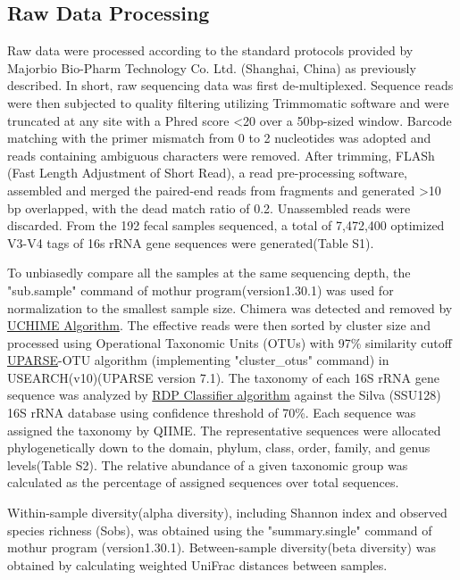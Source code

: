 \documentclass[fleqn,10pt, lineno]{wlpeerj} %
\begin{document}
  \subsection*{Raw Data Processing}
  Raw data were processed according to the standard protocols provided by Majorbio Bio-Pharm Technology Co. Ltd. (Shanghai, China) as previously described\citep{liu2018splenectomy, wang2018bacterial}. In short, raw sequencing data was first de-multiplexed. Sequence reads were then subjected to quality filtering utilizing Trimmomatic software\citep{bolger2014trimmomatic} and were truncated at any site with a Phred score \textless 20 over a 50bp-sized window. Barcode matching with the primer mismatch from 0 to 2 nucleotides was adopted and reads containing ambiguous characters were removed. After trimming, FLASh (Fast Length Adjustment of Short Read)\citep{magovc2011flash}, a read pre-processing software, assembled and merged the paired-end reads from fragments and generated \textgreater 10 bp overlapped, with the dead match ratio of 0.2. Unassembled reads were discarded. From the 192 fecal samples sequenced, a total of 7,472,400 optimized V3-V4 tags of 16s rRNA gene sequences were generated(Table S1).

  To unbiasedly compare all the samples at the same sequencing depth, the "sub.sample" command of mothur program(version1.30.1)\citep{schloss2009introducing} was used for normalization to the smallest sample size. Chimera was detected and removed by \href{https://www.drive5.com/usearch/manual/uchime_algo.html}{UCHIME Algorithm}. The effective reads were then sorted by cluster size and processed using Operational Taxonomic Units (OTUs) with 97\% similarity cutoff \href{http://drive5Tcom/uparse/}{UPARSE}-OTU algorithm (implementing "cluster\_otus" command)\citep{edgar2013uparse} in USEARCH(v10)(UPARSE version 7.1). The taxonomy of each 16S rRNA gene sequence was analyzed by \href{http://rdp.cme.msu.edu/}{RDP Classifier algorithm}\citep{wang2007naive} against the Silva (SSU128) 16S rRNA database\citep{quast2012silva} using confidence threshold of 70\%. Each sequence was assigned the taxonomy by QIIME\citep{caporaso2010qiime}. The representative sequences were allocated phylogenetically down to the domain, phylum, class, order, family, and genus levels(Table S2). The relative abundance of a given taxonomic group was calculated as the percentage of assigned sequences over total sequences.

   Within-sample diversity(alpha diversity), including Shannon index and observed species richness (Sobs), was obtained using the "summary.single" command of mothur program (version1.30.1)\citep{schloss2009introducing}. Between-sample diversity(beta diversity) was obtained by calculating weighted UniFrac distances between samples.
\end{document}
